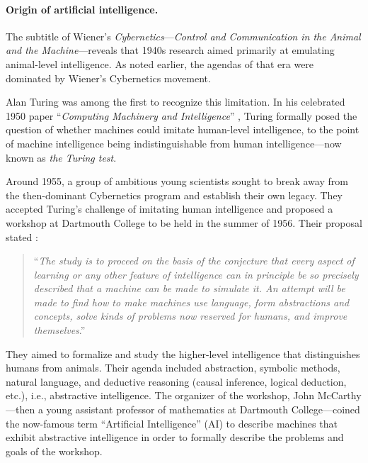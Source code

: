 \documentclass[../../book-main.tex]{subfiles}
\begin{document}
\paragraph{Origin of artificial intelligence.}
The subtitle of Wiener's \textit{Cybernetics}---\textit{Control and Communication in the Animal and the Machine}---reveals that 1940s research aimed primarily at emulating animal-level intelligence. As noted earlier, the agendas of that era were dominated by Wiener's Cybernetics movement.

Alan Turing was among the first to recognize this limitation. In his celebrated 1950 paper ``\textit{Computing Machinery and Intelligence}'' \cite{Turing-1950}, Turing formally posed the question of whether machines could imitate human-level intelligence, to the point of machine intelligence being indistinguishable from human intelligence---now known as \textit{the Turing test}.

Around 1955, a group of ambitious young scientists sought to break away from the then-dominant Cybernetics program and establish their own legacy. They accepted Turing's challenge of imitating human intelligence and proposed a workshop at Dartmouth College to be held in the summer of 1956. Their proposal stated \cite{McCarthy-1955}:
\begin{quote}
    ``\textit{The study is to proceed on the basis of the conjecture that every aspect of learning or any other feature of intelligence can in principle be so precisely described that a machine can be made to simulate it. An attempt will be made to find how to make machines use language, form abstractions and concepts, solve kinds of problems now reserved for humans, and improve themselves}.''
\end{quote}
They aimed to formalize and study the higher-level intelligence that distinguishes humans from animals. Their agenda included abstraction, symbolic methods, natural language, and deductive reasoning (causal inference, logical deduction, etc.), i.e., abstractive intelligence. The organizer of the workshop, John McCarthy---then a young assistant professor of mathematics at Dartmouth College---coined the now-famous term ``Artificial Intelligence'' (AI) to describe machines that exhibit abstractive intelligence in order to formally describe the problems and goals of the workshop.
\end{document}

